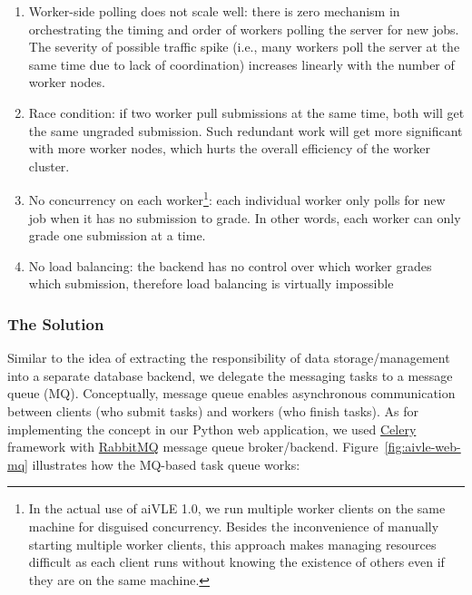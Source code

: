 \begin{enumerate}
    \item Worker-side polling does not scale well: there is zero mechanism in orchestrating the timing and order of workers polling the server for new jobs. The severity of possible traffic spike (i.e., many workers poll the server at the same time due to lack of coordination) increases linearly with the number of worker nodes.
    \item Race condition: if two worker pull submissions at the same time, both will get the same ungraded submission. Such redundant work will get more significant with more worker nodes, which hurts the overall efficiency of the worker cluster.
    \item No concurrency on each worker\footnote{In the actual use of aiVLE 1.0, we run multiple worker clients on the same machine for disguised concurrency. Besides the inconvenience of manually starting multiple worker clients, this approach makes managing resources difficult as each client runs without knowing the existence of others even if they are on the same machine.\label{fn:worker-disguised-concurrency}}: each individual worker only polls for new job when it has no submission to grade. In other words, each worker can only grade one submission at a time.
    \item No load balancing: the backend has no control over which worker grades which submission, therefore load balancing is virtually impossible
\end{enumerate}

\subsubsection{The Solution}
Similar to the idea of extracting the responsibility of data storage/management into a separate database backend, we delegate the messaging tasks to a message queue (MQ). Conceptually, message queue enables asynchronous communication between clients (who submit tasks) and workers (who finish tasks). As for implementing the concept in our Python web application, we used \href{https://docs.celeryq.dev/en/stable/}{Celery} framework with \href{https://www.rabbitmq.com/}{RabbitMQ} message queue broker/backend. Figure~\ref{fig:aivle-web-mq} illustrates how the MQ-based task queue works:

